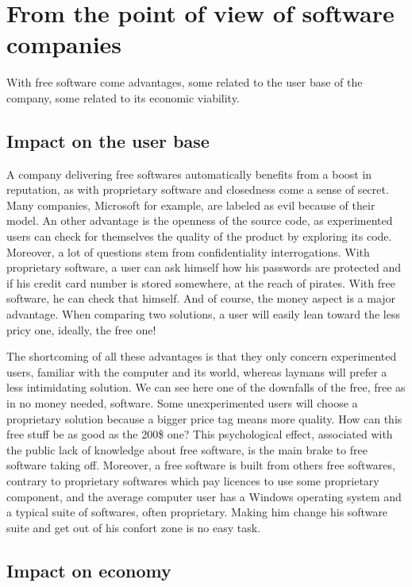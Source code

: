 \documentclass[12pt]{article}
\begin{document}
\section{From the point of view of software companies}

With free software come advantages, some related to the user base of
the company, some related to its economic viability.

\subsection{Impact on the user base}

A company delivering free softwares automatically benefits from a
boost in reputation, as with proprietary software and closedness come
a sense of secret. Many companies, Microsoft for example, are labeled
as evil because of their model. An other advantage is the openness of
the source code, as experimented users can check for themselves the
quality of the product by exploring its code. Moreover, a lot of
questions stem from confidentiality interrogations. With proprietary
software, a user can ask himself how his passwords are protected and
if his credit card number is stored somewhere, at the reach of
pirates. With free software, he can check that himself. And of course,
the money aspect is a major advantage. When comparing two solutions, a
user will easily lean toward the less pricy one, ideally, the free
one!

The shortcoming of all these advantages is that they only concern
experimented users, familiar with the computer and its world, whereas
laymans will prefer a less intimidating solution. We can see here one
of the downfalls of the free, free as in no money needed,
software. Some unexperimented users will choose a proprietary solution
because a bigger price tag means more quality. How can this free
stuff be as good as the 200\$ one? This psychological effect,
associated with the public lack of knowledge about free software, is
the main brake to free software taking off. Moreover, a free software
is built from others free softwares, contrary to proprietary softwares
which pay licences to use some proprietary component, and the average
computer user has a Windows operating system and a typical suite of
softwares, often proprietary. Making him change his software suite and
get out of his confort zone is no easy task.

\subsection{Impact on economy}
\end{document}
